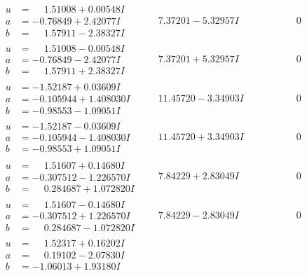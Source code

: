 \documentclass[1p]{elsarticle_modified}
\theoremstyle{definition}
\begin{document}
$$\begin{array}{c|c|c}
\begin{aligned}
u &= \phantom{-}1.51008 + 0.00548 I \\
a &= -0.76849 + 2.42077 I \\
b &= \phantom{-}1.57911 - 2.38327 I\end{aligned}
 & \phantom{-}7.37201 - 5.32957 I & \phantom{-0.000000 } 0 \\ \hline\begin{aligned}
u &= \phantom{-}1.51008 - 0.00548 I \\
a &= -0.76849 - 2.42077 I \\
b &= \phantom{-}1.57911 + 2.38327 I\end{aligned}
 & \phantom{-}7.37201 + 5.32957 I & \phantom{-0.000000 } 0 \\ \hline\begin{aligned}
u &= -1.52187 + 0.03609 I \\
a &= -0.105944 + 1.408030 I \\
b &= -0.98553 - 1.09051 I\end{aligned}
 & \phantom{-}11.45720 - 3.34903 I & \phantom{-0.000000 } 0 \\ \hline\begin{aligned}
u &= -1.52187 - 0.03609 I \\
a &= -0.105944 - 1.408030 I \\
b &= -0.98553 + 1.09051 I\end{aligned}
 & \phantom{-}11.45720 + 3.34903 I & \phantom{-0.000000 } 0 \\ \hline\begin{aligned}
u &= \phantom{-}1.51607 + 0.14680 I \\
a &= -0.307512 - 1.226570 I \\
b &= \phantom{-}0.284687 + 1.072820 I\end{aligned}
 & \phantom{-}7.84229 + 2.83049 I & \phantom{-0.000000 } 0 \\ \hline\begin{aligned}
u &= \phantom{-}1.51607 - 0.14680 I \\
a &= -0.307512 + 1.226570 I \\
b &= \phantom{-}0.284687 - 1.072820 I\end{aligned}
 & \phantom{-}7.84229 - 2.83049 I & \phantom{-0.000000 } 0 \\ \hline\begin{aligned}
u &= \phantom{-}1.52317 + 0.16202 I \\
a &= \phantom{-}0.19102 - 2.07830 I \\
b &= -1.06013 + 1.93180 I\end{aligned}

\end{array}$$
\end{document}
